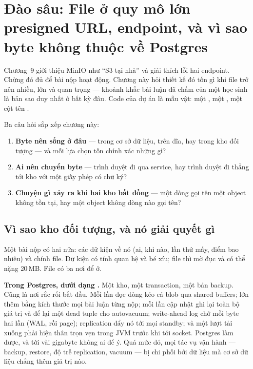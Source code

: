 \chapter{Đào sâu: File ở quy mô lớn --- presigned URL, endpoint, và vì sao byte không thuộc về Postgres}
\label{ch:dd-storage}

Chương~9 giới thiệu MinIO như ``S3 tại nhà'' và giải thích lỗi hai
endpoint. Chừng đó đủ để bài nộp hoạt động. Chương này hỏi thiết kế đó
tốn gì khi file trở nên nhiều, lớn và quan trọng --- khoảnh khắc bài
luận đã chấm của một học sinh là bản sao duy nhất ở bất kỳ đâu. Code
của dự án là mẫu vật: một , một ,
một cột tên .

Ba câu hỏi sắp xếp chương này:

\begin{enumerate}
  \item \textbf{Byte nên sống ở đâu} --- trong cơ sở dữ liệu, trên đĩa,
  hay trong kho đối tượng --- và mỗi lựa chọn tốn chính xác những gì?
  \item \textbf{Ai nên chuyển byte} --- trình duyệt đi qua service, hay
  trình duyệt đi thẳng tới kho với một giấy phép có chữ ký?
  \item \textbf{Chuyện gì xảy ra khi hai kho bất đồng} --- một dòng gọi
  tên một object không tồn tại, hay một object không dòng nào gọi tên?
\end{enumerate}

\section{Vì sao kho đối tượng, và nó giải quyết gì}

Một bài nộp có hai nửa: các dữ kiện về nó (ai, khi nào, lần thứ mấy,
điểm bao nhiêu) và chính file. Dữ kiện có tính quan hệ và bé xíu; file
thì mờ đục và có thể nặng 20\,MB. File có ba nơi để ở.

\textbf{Trong Postgres, dưới dạng .} Một kho, một
transaction, một bản backup. Cũng là nơi rắc rối bắt đầu. Mỗi lần đọc
dòng kéo cả blob qua shared buffers;  lớn thêm bằng kích
thước mọi bài luận từng nộp; mỗi lần cập nhật ghi lại toàn bộ giá trị và
để lại một dead tuple cho autovacuum; write-ahead log chở mỗi byte hai
lần (WAL, rồi page); replication đẩy nó tới mọi standby; và một lượt tải
xuống phải hiện thân trọn vẹn trong JVM trước khi tới socket. Postgres
làm được, và tới vài gigabyte không ai để ý. Quá mức đó, mọi tác vụ vận
hành --- backup, restore, độ trễ replication, vacuum --- bị chi phối bởi
dữ liệu mà cơ sở dữ liệu chẳng thêm giá trị nào.


